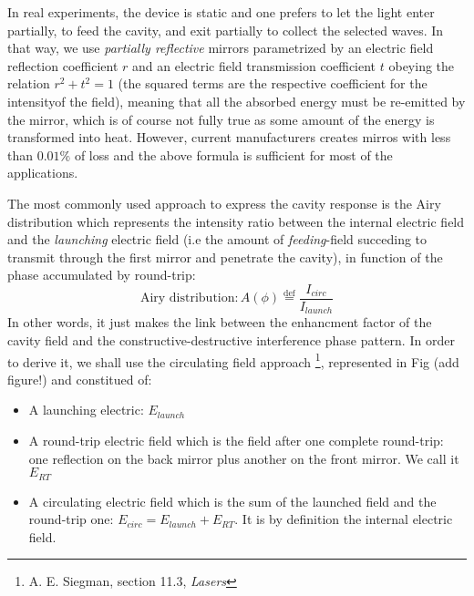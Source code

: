 \documentclass[12pt]{report}
\begin{document}
In real experiments, the device is static and one prefers to let the light enter partially, to feed the cavity, and exit partially to collect the selected waves. In that way, we use \textit{partially reflective} mirrors parametrized by an electric field reflection coefficient $r$ and an electric field transmission coefficient $t$ obeying the relation $r^2 + t^2 = 1$ (the squared terms are the respective coefficient for the intensityof the field), meaning that all the absorbed energy must be re-emitted by the mirror, which is of course not fully true as some amount of the energy is transformed into heat. However, current manufacturers creates mirros with less than $0.01\%$ of loss and the above formula is sufficient for most of the applications.

The most commonly used approach to express the cavity response is the Airy distribution which represents the intensity ratio between the internal electric field and the \textit{launching} electric field (i.e the amount of \textit{feeding}-field succeding to transmit through the first mirror and penetrate the cavity), in function of the phase accumulated by round-trip:
\begin{equation}
\label{eqairy}
\textrm{Airy distribution} : A(\phi) \stackrel{\text{def}}{=} \frac{I_{circ}}{I_{launch}}
\end{equation} In other words, it just makes the link between the enhancment factor of the cavity field and the constructive-destructive interference phase pattern. In order to derive it, we shall use the circulating field approach \footnote{A. E. Siegman, section 11.3, \textit{Lasers}}, represented in Fig (add figure!) and constitued of:
\begin{itemize}
	\item A launching electric: $ E_{launch} $
	\item A round-trip electric field which is the field after one complete round-trip: one reflection on the back mirror plus another on the front mirror. We call it $ E_{RT}$
	\item A circulating electric field which is the sum of the launched field and the round-trip one: $ E_{circ} =  E_{launch} + E_{RT}$. It is by definition the internal electric field.
	
\end{itemize}
\end{document}

